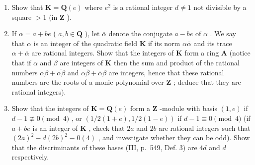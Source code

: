\begin{enumerate}
\def\labelenumi{\alph{enumi})}
\item
  Show that \(\mathbf{K} = \mathbf{Q}(e)\) where \(e^2\) is a rational integer \(d \neq 1\) not divisible by a square \(>1\) (in \(\mathbf{Z}\) ).
\item
  If \(\alpha = a + be\) ( \(a, b \in \mathbf{Q}\) ), let \(\overline{\alpha}\) denote the conjugate \(a - be\) of \(\alpha\) . We say that \(\alpha\) is an integer of the quadratic field \(\mathbf{K}\) if its norm \(\alpha\overline{\alpha}\) and its trace \(\alpha + \overline{\alpha}\) are rational integers. Show that the integers of \(\mathbf{K}\) form a ring \(\mathbf{A}\) (notice that if \(\alpha\) and \(\beta\) are integers of \(\mathbf{K}\) then the sum and product of the rational numbers \(\alpha\beta + \overline{\alpha\beta}\) and \(\alpha\overline{\beta} + \overline{\alpha}\beta\) are integers, hence that these rational numbers are the roots of a monic polynomial over \(\mathbf{Z}\) ; deduce that they are rational integers).
\item
  Show that the integers of \(\mathbf{K} = \mathbf{Q}(e)\) form a \(\mathbf{Z}\) -module with basis \((1, e)\) if \(d - 1 \not\equiv 0 \pmod{4}\) , or \((1/2(1 + e), 1/2(1 - e))\) if \(d - 1 \equiv 0 \pmod{4}\) (if \(a + be\) is an integer of \(\mathbf{K}\) , check that \(2a\) and \(2b\) are rational integers such that \((2a)^2 - d(2b)^2 \equiv 0(4)\) , and investigate whether they can be odd). Show that the discriminants of these bases (III, p.~549, Def. 3) are \(4d\) and \(d\) respectively.
\end{enumerate}

